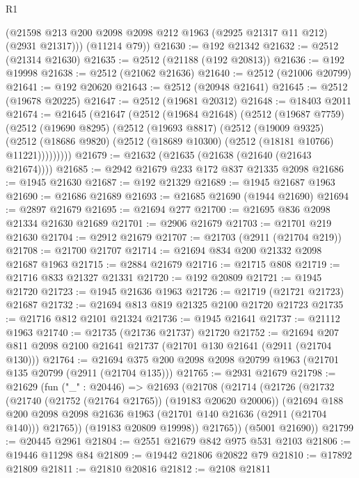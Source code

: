 \begin{lexlean}{R1}
\begin{coremodule}
        (@21598 @213 @200 @2098 @2098 @212 @1963 (@2925 @21317 @11 @212) (@2931 @21317)))
      (@11214 @79))
@21630 := @192 @21342
@21632 := @2512 (@21314 @21630)
@21635 := @2512 (@21188 (@192 @20813))
@21636 := @192 @19998
@21638 := @2512 (@21062 @21636)
@21640 := @2512 (@21006 @20799)
@21641 := @192 @20620
@21643 := @2512 (@20948 @21641)
@21645 := @2512 (@19678 @20225)
@21647 := @2512 (@19681 @20312)
@21648 := @18403 @2011
@21674 := @21645
    (@21647
      (@2512
        (@19684 @21648)
        (@2512
          (@19687 @7759)
          (@2512
            (@19690 @8295)
            (@2512
              (@19693 @8817)
              (@2512
                (@19009 @9325)
                (@2512 (@18686 @9820) (@2512 (@18689 @10300) (@2512 (@18181 @10766) @11221)))))))))
@21679 := @21632 (@21635 (@21638 (@21640 (@21643 @21674))))
@21685 := @2942 @21679 @233 @172 @837 @21335 @2098
@21686 := @1945 @21630
@21687 := @192 @21329
@21689 := @1945 @21687 @1963
@21690 := @21686 @21689
@21693 := @21685 @21690 (@1944 @21690)
@21694 := @2897 @21679
@21695 := @21694 @277
@21700 := @21695 @836 @2098 @21334 @21630 @21689
@21701 := @2906 @21679
@21703 := @21701 @219 @21630
@21704 := @2912 @21679
@21707 := @21703 (@2911 (@21704 @219))
@21708 := @21700 @21707
@21714 := @21694 @834 @200 @21332 @2098 @21687 @1963
@21715 := @2884 @21679
@21716 := @21715 @808
@21719 := @21716 @833 @21327 @21331
@21720 := @192 @20809
@21721 := @1945 @21720
@21723 := @1945 @21636 @1963
@21726 := @21719 (@21721 @21723) @21687
@21732 := @21694 @813 @819 @21325 @2100 @21720 @21723
@21735 := @21716 @812 @2101 @21324
@21736 := @1945 @21641
@21737 := @21112 @1963
@21740 := @21735 (@21736 @21737) @21720
@21752 := @21694 @207 @811 @2098 @2100 @21641 @21737 (@21701 @130 @21641 (@2911 (@21704 @130)))
@21764 := @21694 @375 @200 @2098 @2098 @20799 @1963 (@21701 @135 @20799 (@2911 (@21704 @135)))
@21765 := @2931 @21679
@21798 := @21629
    (fun ("_" : @20446) =>
    @21693
      (@21708
        (@21714
          (@21726
            (@21732
              (@21740 (@21752 (@21764 @21765)) (@19183 @20620 @20006))
              (@21694
                @188
                @200
                @2098
                @2098
                @21636
                @1963
                (@21701 @140 @21636 (@2911 (@21704 @140)))
                @21765))
            (@19183 @20809 @19998))
          @21765))
      (@5001 @21690))
@21799 := @20445 @2961
@21804 := @2551 @21679 @842 @975 @531 @2103
@21806 := @19446 @11298 @84
@21809 := @19442 @21806 @20822 @79
@21810 := @17892 @21809
@21811 := @21810 @20816
@21812 := @2108 @21811

\end{coremodule}
\end{lexlean}
